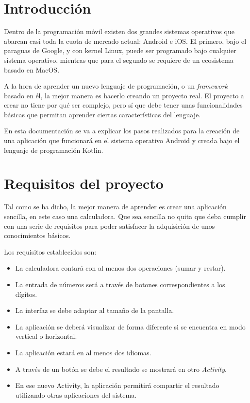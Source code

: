 \documentclass{\ClassPath/viu-tfm-template}
\begin{document}
    \graphicspath{{../../VIU_TFM_LaTeX_template/}}

    \coverpage

    \tableofcontents

\chapter{Introducción}

Dentro de la programación móvil existen dos grandes sistemas operativos que abarcan casi toda la cuota de mercado actual: Android e iOS. El primero, bajo el paraguas de Google, y con kernel Linux, puede ser programado bajo cualquier sistema operativo, mientras que para el segundo se requiere de un ecosistema basado en MacOS.

A la hora de aprender un nuevo lenguaje de programación, o un \textit{framework} basado en él, la mejor manera es hacerlo creando un proyecto real. El proyecto a crear no tiene por qué ser complejo, pero sí que debe  tener unas funcionalidades básicas que permitan aprender ciertas características del lenguaje.

En esta documentación se va a explicar los pasos realizados para la creación de una aplicación que funcionará en el sistema operativo Android y creada bajo el lenguaje de programación Kotlin.


\chapter{Requisitos del proyecto}

Tal como se ha dicho, la mejor manera de aprender es crear una aplicación sencilla, en este caso una calculadora. Que sea sencilla no quita que deba cumplir con una serie de requisitos para poder satisfacer la adquisición de unos conocimientos básicos.

Los requisitos establecidos son:

\begin{itemize}
    \item La calculadora contará con al menos dos operaciones (sumar y restar).
    \item La entrada de números será a través de botones correspondientes a los dígitos.
    \item La interfaz se debe adaptar al tamaño de la pantalla.
    \item La aplicación se deberá visualizar de forma diferente si se encuentra en modo vertical o horizontal.
    \item La aplicación estará en al menos dos idiomas.
    \item A través de un botón se debe el resultado se mostrará en otro \textit{Activity}.
    \item En ese nuevo Activity, la aplicación permitirá compartir el resultado utilizando otras aplicaciones del sistema.
\end{itemize}
\end{document}
